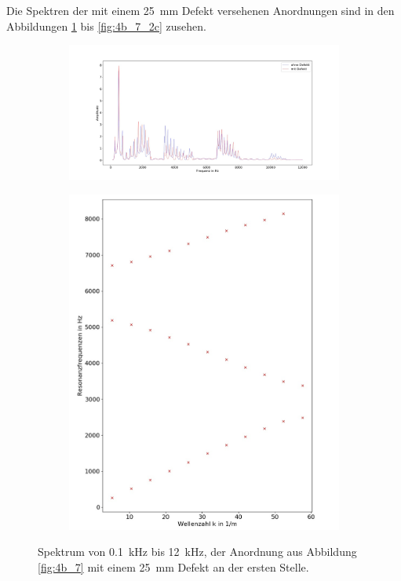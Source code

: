 Die Spektren der mit einem 25~mm Defekt versehenen Anordnungen sind in den Abbildungen \ref{fig:4b_7_2a} bis \ref{fig:4b_7_2c} zusehen.
\begin{figure}
\centering
\begin{subfigure}{0.65\textwidth}
\includegraphics[width=\textwidth]{content/Scripts/defect4.jpg}
\end{subfigure}
\begin{subfigure}{0.34\textwidth}
\includegraphics[width=\textwidth]{content/Scripts/4b_7_2a.jpg}
\end{subfigure}
\caption{Spektrum von 0.1~kHz bis 12~kHz, der Anordnung aus Abbildung \ref{fig:4b_7} mit einem 25~mm Defekt an der ersten Stelle.}
\label{fig:4b_7_2a}
\end{figure}
